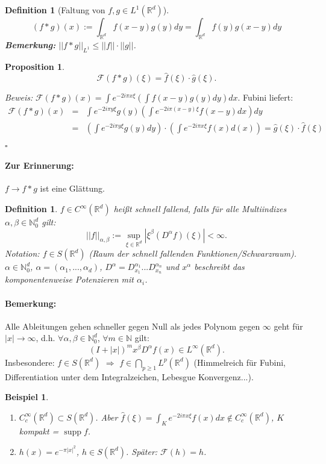 \documentclass[12pt,a4paper,titlepage]{scrartcl}
\newtheorem{Definition}[Satz]{Definition}
\newtheorem{Beispiel}[Satz]{Beispiel}
\newtheorem{Prop}[Satz]{Proposition}
\DeclareMathOperator{\supp}{supp}
\numberwithin{equation}{section}
\newcommand{\R}{\mathbb{R}} %
\newcommand{\N}{\mathbb{N}} %
\newcommand{\f}{\hat{f}}
\newcommand{\g}{\hat{g}}
\newcommand{\F}{\mathcal{F}}
\newcommand{\m}{\cdot}
\newcommand{\Bew}{\emph{Beweis: }}
\newcommand{\qed}{\begin{flushright}
		$\square$
	\end{flushright}}
\begin{document}
	\begin{Definition}[Faltung von $f,g\in L^1(\R^d)$]
		$$(f*g)(x):= \int_{\R^d}f(x-y)g(y)dy = \int_{\R^d}f(y) g(x-y) dy$$
		\textbf{Bemerkung:} $||f*g||_{L^1}\leq ||f||\m ||g||$.
	\end{Definition}
	
	\begin{Prop}
		$$\F(f*g)(\xi) = \f(\xi)\m \g(\xi).$$
	\end{Prop}
	
	\Bew $\F(f*g)(x) = \int e^{-2i\pi x\xi}(\int f(x-y)g(y)dy)dx$. Fubini liefert:
	\begin{eqnarray}
		\F(f*g)(x) &=& \int e^{-2i\pi y\xi}g(y) (\int e^{-2i\pi (x-y)\xi}f(x-y)dx)dy\nonumber\\
		&=&(\int e^{-2i\pi y\xi}g(y)dy)\m(\int e^{-2i\pi x\xi}f(x)d(x)) = \g(\xi)\m \f(\xi)\nonumber
	\end{eqnarray}
	\qed
	
	\paragraph{Zur Erinnerung:} $f\rightarrow f*g$ ist eine Glättung.
	
	\begin{Definition}
		$f\in C^{\infty}(\R^d)$ heißt schnell fallend, falls für alle Multiindizes $\alpha,\beta \in \N_0^d$ gilt: 
		$$||f||_{\alpha,\beta} := \sup_{\xi\in \R^d}|\xi^\beta(D^\alpha f)(\xi)| <\infty.$$
		Notation: $f\in S(\R^d)$ (Raum der schnell fallenden Funktionen/Schwarzraum). $\alpha\in \N_0^d$, $\alpha = (\alpha_1,...,\alpha_d)$, $D^\alpha = D_{x_1}^{\alpha_1}...D_{x_n}^{\alpha_n}$ und $x^\alpha$ beschreibt das komponentenweise Potenzieren mit $\alpha_i$.
	\end{Definition}
	
	\paragraph{Bemerkung:} Alle Ableitungen gehen schneller gegen Null als jedes Polynom gegen $\infty$ geht für $|x|\rightarrow \infty$, d.h. $\forall\alpha,\beta\in \N_0^d$, $\forall m\in \N$ gilt:
	$$(I+|x|)^m x^\beta D^\alpha f(x)\in L^\infty(\R^d).$$
	Insbesondere: $f\in S(\R^d)$ $\Rightarrow$ $f\in \bigcap_{p\geq 1} L^p(\R^d)$ (Himmelreich für Fubini, Differentiation unter dem Integralzeichen, Lebesgue Konvergenz...).
	
	\begin{Beispiel}
		~
		\begin{enumerate}
			\item[a)] $C_c^{\infty}(\R^d)\subset S(\R^d)$. Aber $\f(\xi) = \int_K e^{-2i\pi x\xi}f(x) dx\notin C_c^{\infty}(\R^d)$, $K$ kompakt = $\supp f$.
			\item[b)] $h(x) = e^{-\pi|x|^2}$, $h\in S(\R^d)$. Später: $\F(h) = h$.
		\end{enumerate}
	\end{Beispiel}
	
\end{document}
